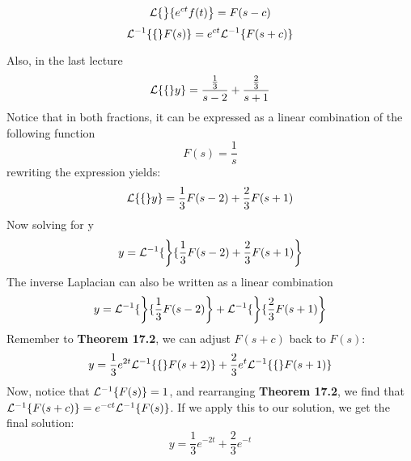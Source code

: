 \documentclass[diffeq.tex]{subfiles}
\begin{document}
    \begin{btheorem}
        \begin{equation}
            \mathcal{L}\{\left\}\{e^{ct}f(t)\right\} = F(s - c)
        \end{equation}
        \begin{equation}
            \mathcal{L}^{-1}\{\{\}F(s)\} = e^{ct}\mathcal{L}^{-1}\{F(s + c)\}
        \end{equation}
    \end{btheorem}\np
    Also, in the last lecture
    \begin{equation}
        \mathcal{L}\{\{\}y\} = \frac{\frac{1}{3}}{s - 2} + \frac{\frac{2}{3}}{s + 1}
    \end{equation}
    Notice that in both fractions, it can be expressed as a linear combination of the following function
    \begin{equation}
        F(s) = \frac{1}{s}
    \end{equation}
    rewriting the expression yields:
    \begin{equation}
        \mathcal{L}\{\{\}y\} = \frac{1}{3}F(s - 2) + \frac{2}{3}F(s + 1)
    \end{equation}
    Now solving for y
    \begin{equation}
        y = \mathcal{L}^{-1}\{\left\}\{\frac{1}{3}F(s - 2) + \frac{2}{3}F(s + 1)\right\}
    \end{equation}
    The inverse Laplacian can also be written as a linear combination
    \begin{equation}
        y = \mathcal{L}^{-1}\{\left\}\{\frac{1}{3}F(s - 2)\right\} + \mathcal{L}^{-1}\{\left\}\{\frac{2}{3}F(s + 1)\right\}
    \end{equation}
    Remember to \textbf{Theorem 17.2}, we can adjust $F(s + c)$ back to $F(s)$:
    \begin{equation}
        y = \frac{1}{3}e^{2t}\mathcal{L}^{-1}\{\{\}F(s + 2)\} + \frac{2}{3}e^{t}\mathcal{L}^{-1}\{\{\}F(s + 1)\}
    \end{equation}
    Now, notice that $\mathcal{L}^{-1}\{F(s)\} = 1$, and rearranging \textbf{Theorem 17.2}, we find that $\mathcal{L}^{-1}\{F(s + c)\} = e^{-ct}\mathcal{L}^{-1}\{F(s)\}$. If we apply this to our solution, we get the final solution:
    \begin{equation}
        y = \frac{1}{3}e^{-2t}+\frac{2}{3}e^{-t}
    \end{equation}
\end{document}
